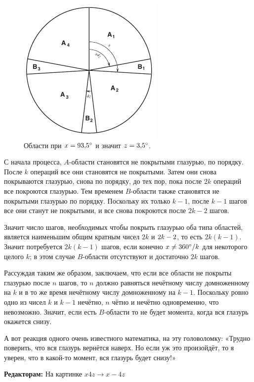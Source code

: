 \begin{figure}[htb!]
\centering
\includegraphics[scale=1]{pics/tort3}
\caption{Области при $x = 93{,}5\degree$ и значит $z = 3{,}5\degree$.}
\label{pic:tort3}
\end{figure}

С начала процесса, $A$-области становятся не покрытыми глазурью, по порядку.
После $k$ операций все они становятся не покрытыми.
Затем они снова покрываются глазурью, снова по порядку, до тех пор, пока после $2k$ операций все покроются глазурью.
Тем временем $B$-области также становятся не покрытыми глазурью по порядку.
Поскольку их только $k - 1$, после $k - 1$ шагов все они станут не покрытыми, и все снова покроются после $2k - 2$ шагов.

Значит число шагов, необходимых чтобы покрыть глазурью оба типа областей, является наименьшим общим кратным чисел $2k$ и $2k \z- 2$, то есть $2k(k - 1)$.
Значит потребуется $2k(k - 1)$ шагов, если конечно $x \ne 360\degree/k$ для некоторого целого $k$;
в этом случае $B$-области отсутствуют и достаточно $2k$ шагов.

Рассуждая таким же образом, заключаем, что если все области не покрыты глазурью после $n$ шагов,
то $n$ должно равняться нечётному числу домноженному на $k$
и в то же время нечётному числу домноженному на $k - 1$.
Поскольку ровно одно из чисел $k$ и $k - 1$ нечётно, $n$ чётно и нечётно одновременно,
что невозможно.
Значит, если есть $B$-области то не будет момента, когда вся глазурь окажется снизу.

А вот реакция одного очень известного математика, на эту головоломку:
«Трудно поверить, что вся глазурь вернётся наверх.
Но если уж это произойдёт, то я уверен, что в какой-то момент, вся глазурь будет снизу!»

\begin{addedbytheeditors}
\textbf{Редакторам:} На картинке $x4z\to x-4z$
\end{addedbytheeditors}

